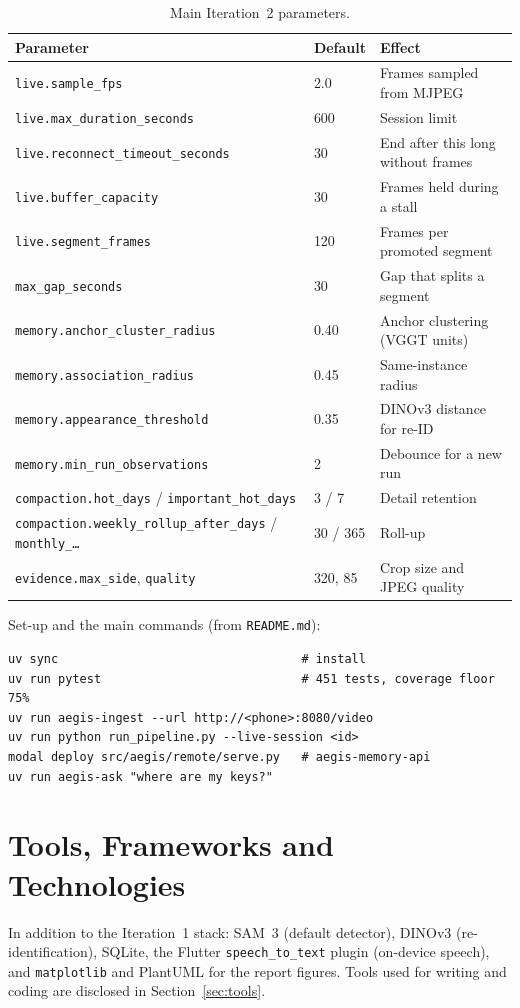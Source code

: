 \begin{table}[H]\centering\footnotesize
\caption{Main Iteration~2 parameters.}\label{tab:params}
\begin{tabularx}{\textwidth}{@{}L{4.6cm} l Y@{}}\toprule
{}\textbf{Parameter} & \textbf{Default} & \textbf{Effect}\\\midrule
\texttt{live.sample\_fps} & 2.0 & Frames sampled from MJPEG\\
\texttt{live.max\_duration\_seconds} & 600 & Session limit\\
\texttt{live.reconnect\_timeout\_seconds} & 30 & End after this long without frames\\
\texttt{live.buffer\_capacity} & 30 & Frames held during a stall\\
\texttt{live.segment\_frames} & 120 & Frames per promoted segment\\
\texttt{max\_gap\_seconds} & 30 & Gap that splits a segment\\
\texttt{memory.anchor\_cluster\_radius} & 0.40 & Anchor clustering (VGGT units)\\
\texttt{memory.association\_radius} & 0.45 & Same-instance radius\\
\texttt{memory.appearance\_threshold} & 0.35 & DINOv3 distance for re-ID\\
\texttt{memory.min\_run\_observations} & 2 & Debounce for a new run\\
\texttt{compaction.hot\_days} / \texttt{important\_hot\_days} & 3 / 7 & Detail retention\\
\texttt{compaction.weekly\_rollup\_after\_days} / \texttt{monthly\_\ldots} & 30 / 365 & Roll-up\\
\texttt{evidence.max\_side}, \texttt{quality} & 320, 85 & Crop size and JPEG quality\\
\bottomrule\end{tabularx}\end{table}

Set-up and the main commands (from \texttt{README.md}):
\begin{verbatim}
uv sync                                  # install
uv run pytest                            # 451 tests, coverage floor 75%
uv run aegis-ingest --url http://<phone>:8080/video
uv run python run_pipeline.py --live-session <id>
modal deploy src/aegis/remote/serve.py   # aegis-memory-api
uv run aegis-ask "where are my keys?"
\end{verbatim}

\section{Tools, Frameworks and Technologies}
In addition to the Iteration~1 stack: SAM~3 (default detector), DINOv3
(re-identification), SQLite, the Flutter \texttt{speech\_to\_text} plugin
(on-device speech), and \texttt{matplotlib} and PlantUML for the report figures.
Tools used for writing and coding are disclosed in Section~\ref{sec:tools}.

